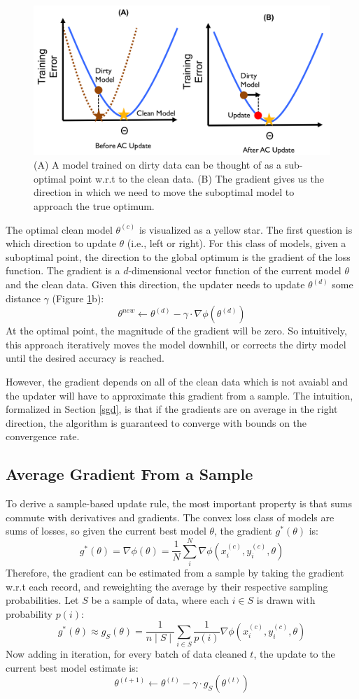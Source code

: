 \begin{figure}[ht!]
\centering
 \includegraphics[width=0.7\columnwidth]{figs/update-arch2.png}
 \caption{(A) A model trained on dirty data can be thought of as a sub-optimal point w.r.t to the clean data. (B) The gradient gives us the direction in which we need to move the suboptimal model to approach the true optimum. \label{update-arch2}}
\end{figure}

The optimal clean model $\theta^{(c)}$ is visualized as a yellow star.
The first question is which direction to update $\theta$ (i.e., left or right).
For this class of models, given a suboptimal point, the direction to 
the global optimum is the gradient of the loss function.
The gradient is a $d$-dimensional vector function of the current model $\theta$ and the clean data.
Given this direction, the updater needs to update $\theta^{(d)}$ some distance $\gamma$ (Figure \ref{update-arch2}b):
\[
\theta^{new} \leftarrow \theta^{(d)} - \gamma \cdot \nabla\phi(\theta^{(d)})
\]
At the optimal point, the magnitude of the gradient will be zero.
So intuitively, this approach iteratively moves the model downhill, or corrects the dirty model until the desired accuracy is reached.

However, the gradient depends on all of the clean data which is not avaiabl and the updater will have to approximate this gradient from a sample.
The intuition, formalized in Section \ref{sgd}, is that if the gradients are on average in the right direction, the algorithm is guaranteed to converge with bounds on the convergence rate.

\subsection{Average Gradient From a Sample}
To derive a sample-based update rule, the most important property is that sums commute with derivatives and gradients.
The convex loss class of models are sums of losses, so given the current best model $\theta$, the gradient $g^*(\theta)$ is:
\[
g^*(\theta) = \nabla\phi(\theta) = \frac{1}{N} \sum_i^N \nabla\phi(x_i^{(c)},y_i^{(c)},\theta)
\]
Therefore, the gradient can be estimated from a sample by taking the gradient w.r.t each record, and reweighting the average by their respective sampling probabilities.
Let $S$ be a sample of data, where each $i \in S$ is drawn with probability $p(i)$:
\[
g^*(\theta) \approx g_{S}(\theta) = \frac{1}{n\mid S \mid} \sum_{i \in S}\frac{1}{p(i)}\nabla\phi(x_i^{(c)},y_i^{(c)},\theta)
\]
Now adding in iteration, for every batch of data cleaned $t$, the update to the current best model estimate is:
\[
\theta^{(t+1)} \leftarrow \theta^{(t)} - \gamma \cdot g_{S}(\theta^{(t)})
\]

